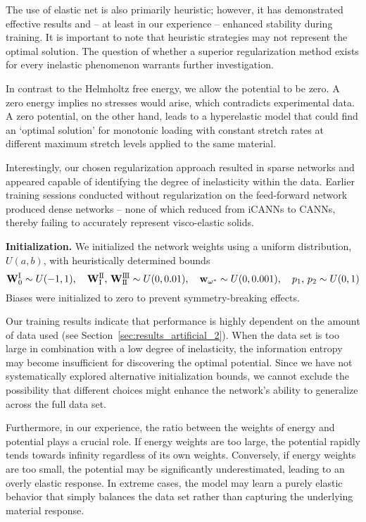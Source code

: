 The use of elastic net is also primarily heuristic; however, it has demonstrated effective results and -- at least in our experience -- enhanced stability during training. 
It is important to note that heuristic strategies may not represent the optimal solution. 
The question of whether a superior regularization method exists for every inelastic phenomenon warrants further investigation.

In contrast to the Helmholtz free energy, we allow the potential to be zero. 
A zero energy implies no stresses would arise, which contradicts experimental data. 
A zero potential, on the other hand, leads to a hyperelastic model that could find an `optimal solution' for monotonic loading with constant stretch rates at different maximum stretch levels applied to the same material.

Interestingly, our chosen regularization approach resulted in sparse networks and appeared capable of identifying the degree of inelasticity within the data. 
Earlier training sessions conducted without regularization on the feed-forward network produced dense networks -- none of which reduced from iCANNs to CANNs, thereby failing to accurately represent visco-elastic solids.\newline

\textbf{Initialization.} We initialized the network weights using a uniform distribution, \( U(a,b) \), with heuristically determined bounds
\begin{equation}
\mathbf{W}_0^{\text{I}}\sim U(-1,1),\quad 
\mathbf{W}_{\text{I}}^{\text{I\hspace{-0.2mm}I}},\,\mathbf{W}_{\text{I\hspace{-0.2mm}I}}^{\text{I\hspace{-0.2mm}I\hspace{-0.2mm}I}}\sim U(0,0.01),\quad 
\mathbf{w}_{\omega^*}\sim U(0,0.001),\quad 
p_1,\,p_2\sim U(0,1)
\end{equation}
Biases were initialized to zero to prevent symmetry-breaking effects.

Our training results indicate that performance is highly dependent on the amount of data used (see Section~\ref{sec:results_artificial_2}). 
When the data set is too large in combination with a low degree of inelasticity, the information entropy may become insufficient for discovering the optimal potential. 
Since we have not systematically explored alternative initialization bounds, we cannot exclude the possibility that different choices might enhance the network’s ability to generalize across the full data set.

Furthermore, in our experience, the ratio between the weights of energy and potential plays a crucial role. 
If energy weights are too large, the potential rapidly tends towards infinity regardless of its own weights. 
Conversely, if energy weights are too small, the potential may be significantly underestimated, leading to an overly elastic response. 
In extreme cases, the model may learn a purely elastic behavior that simply balances the data set rather than capturing the underlying material response.

